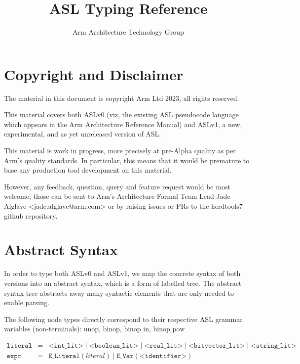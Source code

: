 \documentclass{book}
\author{Arm Architecture Technology Group}
\title{ASL Typing Reference}
\begin{document}
\maketitle
\tableofcontents{}

\chapter{Copyright and Disclaimer}

The material in this document is copyright Arm Ltd 2023, all rights reserved.

This material covers both ASLv0 (viz, the existing ASL pseudocode language
which appears in the Arm Architecture Reference Manual) and ASLv1, a new,
experimental, and as yet unreleased version of ASL.

This material is work in progress, more precisely at pre-Alpha quality as
per Arm’s quality standards. In particular, this means that it would be
premature to base any production tool development on this material.

However, any feedback, question, query and feature request would be most
welcome; those can be sent to Arm’s Architecture Formal Team Lead Jade
Alglave <jade.alglave@arm.com> or by raising issues or PRs to the herdtools7
github repository.

\chapter{Abstract Syntax}
In order to type both ASLv0 and ASLv1, we map the concrete syntax of both versions into an abstract syntax, which is a form of labelled tree. The abstract syntax tree abstracts away many syntactic elements that are only needed to enable parsing.

\newcommand\BNOT[0]{\texttt{"!"}}
\newcommand\NEG[0]{\texttt{"-"}}
\newcommand\NOT[0]{\texttt{"NOT"}}

\newcommand\unop[0]{\textrm{unop}}
\newcommand\binop[0]{\textrm{binop}}
\newcommand\binopin[0]{\textrm{binop\_in}}
\newcommand\binoppow[0]{\textrm{binop\_pow}}

\newcommand\literal[0]{\texttt{literal}}
\newcommand\expr[0]{\texttt{expr}}

The following node types directly correspond to their respective ASL grammar variables (non-terminals):  $\unop$, $\binop$, $\binopin$, $\binoppow$

\[
\begin{array}{rcl}
\literal &=& \texttt{<int\_lit>} \;|\; \texttt{<boolean\_lit>} \;|\; \texttt{<real\_lit>} \;|\; \texttt{<bitvector\_lit>} \;|\; \texttt{<string\_lit>}\\
\expr &=& \texttt{E\_Literal}(literal) \;|\; \texttt{E\_Var}(\texttt{<identifier>})
\end{array}
\]
\end{document}
